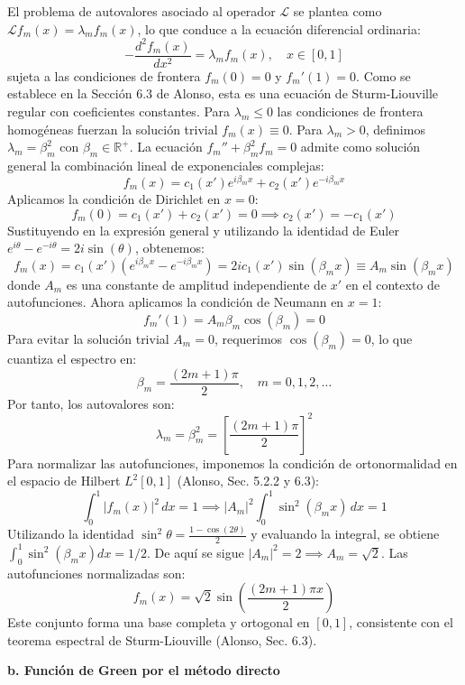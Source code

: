 \documentclass[a4paper]{article}
\begin{document}
El problema de autovalores asociado al operador $\mathscr{L}$ se plantea como $\mathscr{L}f_m(x) = \lambda_m f_m(x)$, lo que conduce a la ecuación diferencial ordinaria:
$$ -\frac{d^2 f_m(x)}{dx^2} = \lambda_m f_m(x), \quad x \in [0, 1] $$
sujeta a las condiciones de frontera $f_m(0) = 0$ y $f_m'(1) = 0$. Como se establece en la Sección 6.3 de Alonso, esta es una ecuación de Sturm-Liouville regular con coeficientes constantes. Para $\lambda_m \leq 0$ las condiciones de frontera homogéneas fuerzan la solución trivial $f_m(x) \equiv 0$. Para $\lambda_m > 0$, definimos $\lambda_m = \beta_m^2$ con $\beta_m \in \mathbb{R}^+$. La ecuación $f_m'' + \beta_m^2 f_m = 0$ admite como solución general la combinación lineal de exponenciales complejas:
$$ f_m(x) = c_1(x') e^{i\beta_m x} + c_2(x') e^{-i\beta_m x} $$
Aplicamos la condición de Dirichlet en $x=0$:
$$ f_m(0) = c_1(x') + c_2(x') = 0 \implies c_2(x') = -c_1(x') $$
Sustituyendo en la expresión general y utilizando la identidad de Euler $e^{i\theta} - e^{-i\theta} = 2i\sin(\theta)$, obtenemos:
$$ f_m(x) = c_1(x') \left( e^{i\beta_m x} - e^{-i\beta_m x} \right) = 2i c_1(x') \sin(\beta_m x) \equiv A_m \sin(\beta_m x) $$
donde $A_m$ es una constante de amplitud independiente de $x'$ en el contexto de autofunciones. Ahora aplicamos la condición de Neumann en $x=1$:
$$ f_m'(1) = A_m \beta_m \cos(\beta_m) = 0 $$
Para evitar la solución trivial $A_m = 0$, requerimos $\cos(\beta_m) = 0$, lo que cuantiza el espectro en:
$$ \beta_m = \frac{(2m+1)\pi}{2}, \quad m = 0, 1, 2, \dots $$
Por tanto, los autovalores son:
$$ \lambda_m = \beta_m^2 = \left[ \frac{(2m+1)\pi}{2} \right]^2 $$
Para normalizar las autofunciones, imponemos la condición de ortonormalidad en el espacio de Hilbert $L^2[0,1]$ (Alonso, Sec. 5.2.2 y 6.3):
$$ \int_0^1 |f_m(x)|^2 \, dx = 1 \implies |A_m|^2 \int_0^1 \sin^2(\beta_m x) \, dx = 1 $$
Utilizando la identidad $\sin^2\theta = \frac{1-\cos(2\theta)}{2}$ y evaluando la integral, se obtiene $\int_0^1 \sin^2(\beta_m x) dx = 1/2$. De aquí se sigue $|A_m|^2 = 2 \implies A_m = \sqrt{2}$. Las autofunciones normalizadas son:
$$ f_m(x) = \sqrt{2} \sin\left( \frac{(2m+1)\pi x}{2} \right) $$
Este conjunto forma una base completa y ortogonal en $[0,1]$, consistente con el teorema espectral de Sturm-Liouville (Alonso, Sec. 6.3).

\textbf{b. Función de Green por el método directo}
\end{document}
